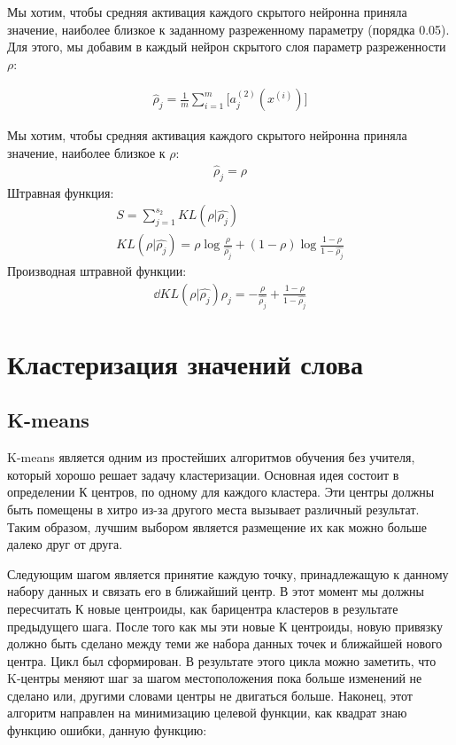\documentclass[12pt]{article}
\begin{document}
Мы хотим, чтобы средняя активация каждого скрытого нейронна приняла значение, наиболее близкое к заданному разреженному параметру (порядка 0.05). Для этого, мы добавим в каждый нейрон скрытого слоя параметр разреженности $\rho$:

  \begin{align}
	\hat \rho_j=\frac{1}{m}\sum_{i=1}^m\biggl[a^{(2)}_j(x^{(i)})\biggl]
  \end{align}

  Мы хотим, чтобы средняя активация каждого скрытого нейронна приняла значение, наиболее близкое к $\rho$:
  \begin{align}
	\hat \rho_j=\rho
  \end{align}
  Штравная функция:
  \begin{align}
	S=\sum_{j=1}^{s_2}{KL({\rho}|{\hat{\rho_j}})}\\
	KL({\rho}|{\hat{\rho_j}})=\rho\log{\frac{\rho}{\hat{\rho_j}}}+(1-\rho)\log{\frac{1-\rho}{1-\hat{\rho_j}}}
  \end{align}
  Производная штравной функции:
  \begin{align}
	\dd{KL({\rho}|{\hat{\rho_j}})}{\rho_j}=-\frac{\rho}{\hat{\rho_j}} + \frac{1-\rho}{1-\hat{\rho_j}}
  \end{align}

\section{Кластеризация значений слова}

\subsection{K-means}

K-means является одним из простейших алгоритмов обучения без учителя, который хорошо решает задачу кластеризации. Основная идея состоит в определении К центров, по одному для каждого кластера. Эти центры должны быть помещены в хитро из-за другого места вызывает различный результат. Таким образом, лучшим выбором является размещение их как можно больше далеко друг от друга.

Следующим шагом является принятие каждую точку, принадлежащую к данному набору данных и связать его в ближайший центр. В этот момент мы должны пересчитать К новые центроиды, как барицентра кластеров в результате предыдущего шага. После того как мы эти новые К центроиды, новую привязку должно быть сделано между теми же набора данных точек и ближайшей нового центра. Цикл был сформирован. В результате этого цикла можно заметить, что K-центры меняют шаг за шагом местоположения пока больше изменений не сделано или, другими словами центры не двигаться больше. Наконец, этот алгоритм направлен на минимизацию целевой функции, как квадрат знаю функцию ошибки, данную функцию:
\end{document}
